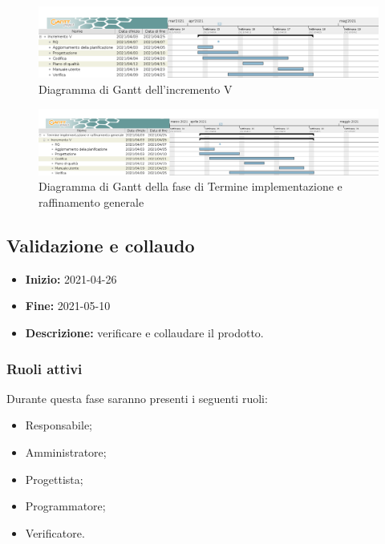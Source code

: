 \begin{figure}[H]
    \centering
    \includegraphics[width=1\linewidth]{res/images/pianificazione/incremento_5.png}
    \caption{Diagramma di Gantt dell'incremento V}
    \label{fig:_Gantt incremento V}
\end{figure}

\begin{figure}[H]
    \centering
    \includegraphics[width=1\linewidth]{res/images/pianificazione/termine_implementazione_e_raffinamento_generale.png}
    \caption{Diagramma di Gantt della fase di Termine implementazione e raffinamento generale}
    \label{fig:_Gantt termine implementazione e raffinamento generale}
\end{figure}


\subsection{Validazione e collaudo} \label{_pianificazioneValidazioneCollaudo}
\begin{itemize}
    \item [] \textbf{Inizio:} 2021-04-26
    \item [] \textbf{Fine:} 2021-05-10
    \item [] \textbf{Descrizione:} verificare e collaudare il prodotto.
\end{itemize}

\subsubsection{Ruoli attivi}
Durante questa fase saranno presenti i seguenti ruoli:
\begin{itemize}
    \item Responsabile;
    \item Amministratore;
    \item Progettista;
    \item Programmatore;
    \item Verificatore.
\end{itemize}

